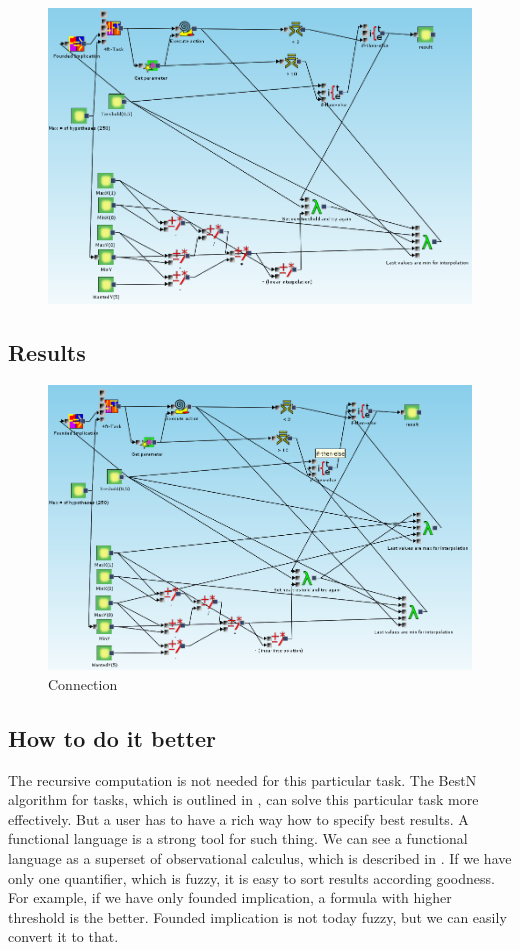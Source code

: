 \documentclass[a4paper,12pt]{book}
\begin{document}
\begin{figure}
	\includegraphics[width=13.72cm]{exampleWithoutInterpolationOnMax}
\end{figure}

\subsection{Results}
\begin{figure}
	\includegraphics[width=13.72cm]{exampleResult}
	\caption{Connection}
\end{figure}


\subsection{How to do it better}
The recursive computation is not needed for this particular task. The BestN algorithm for tasks, which is outlined in \cite{thesisKuchar}, can solve this particular task more effectively. But a user has to have a rich way how to specify best results. A functional language is a strong tool for such thing. We can see a functional language as a superset of observational calculus, which is described in \cite{GUHAbook}. If we have only one quantifier, which is fuzzy, it is easy to sort results according goodness. For example, if we have only founded implication, a formula with higher threshold is the better. Founded implication is not today fuzzy, but we can easily convert it to that.
\end{document}
